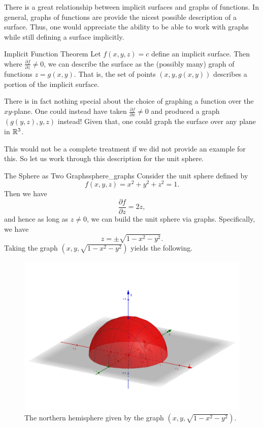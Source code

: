                  There is a great relationship between implicit surfaces and graphs of functions.  In general, graphs of functions are provide the nicest possible description of a surface.  Thus, one would appreciate the ability to be able to work with graphs while still defining a surface implicitly.

                 \begin{thm}{Implicit Function Theorem}
                 	Let $f(x,y,z)=c$ define an implicit surface.  Then where $\frac{\partial f}{\partial z}\neq 0$, we can describe the surface as the (possibly many) graph of functions $z=g(x,y)$. That is, the set of points $(x,y,g(x,y))$ describes a portion of the implicit surface.
                 \end{thm}

                 \begin{remark}
                 	There is in fact nothing special about the choice of graphing a function over the $xy$-plane.  One could instead have taken $\frac{\partial f}{\partial x} \neq 0$ and produced a graph $(g(y,z),y,z)$ instead! Given that, one could graph the surface over any plane in $\mathbb{R}^3$.
                 \end{remark}

                 This would not be a complete treatment if we did not provide an example for this.  So let us work through this description for the unit sphere.

                 \begin{ex}{The Sphere as Two Graphs}{sphere_graphs}
                 	Consider the unit sphere defined by
                 	\[
                 	f(x,y,z) = x^2+y^2+z^2 = 1.
                 	\]
                 	Then we have
                 	\[
                 	\frac{\partial f}{\partial z} = 2z,
                 	\]
                 	and hence as long as $z\neq 0$, we can build the unit sphere via graphs.  Specifically, we have
                 	\[
                 	z = \pm \sqrt{1-x^2-y^2}.
                 	\]
                 	Taking the graph $(x,y,\sqrt{1-x^2-y^2})$ yields the following.
                 	\begin{figure}[H]
                 		\centering
                 		\includegraphics[width=.8\textwidth]{Figures_Part_6/hemisphere.png}
                 		\caption{The northern hemisphere given by the graph $(x,y,\sqrt{1-x^2-y^2})$.}
                 	\end{figure}
                 \end{ex}

